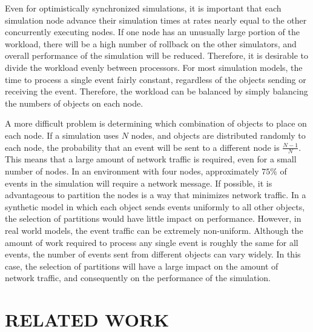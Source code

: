 \documentclass{wscpaperproc}
\begin{document}
Even for optimistically synchronized simulations, it is important that each simulation node advance their simulation times at rates nearly equal to the other concurrently executing nodes. If one node has an unusually large portion of the workload, there will be a high number of rollback on the other simulators, and overall performance of the simulation will be reduced. Therefore, it is desirable to divide the workload evenly between processors. For most simulation models, the time to process a single event fairly constant, regardless of the objects sending or receiving the event. Therefore, the workload can be balanced by simply balancing the numbers of objects on each node.

A more difficult problem is determining which combination of objects to place on each node. If a simulation uses \(N\) nodes, and objects are distributed randomly to each node, the probability that an event will be sent to a different node is \(\frac{N-1}{N}\). This means that a large amount of network traffic is required, even for a small number of nodes. In an environment with four nodes, approximately \(75\%\) of events in the simulation will require a network message. If possible, it is advantageous to partition the nodes is a way that minimizes network traffic. In a synthetic model in which each object sends events uniformly to all other objects, the selection of partitions would have little impact on performance. However, in real world models, the event traffic can be extremely non-uniform. Although the amount of work required to process any single event is roughly the same for all events, the number of events sent from different objects can vary widely. In this case, the selection of partitions will have a large impact on the amount of network traffic, and consequently on the performance of the simulation.

\section{RELATED WORK}\label{sec:related}
\end{document}
